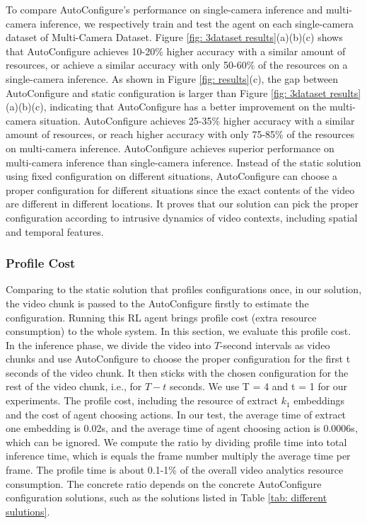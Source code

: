 To compare AutoConfigure's performance on single-camera inference and multi-camera inference, we respectively train and test the agent on each single-camera dataset of Multi-Camera Dataset. Figure \ref{fig: 3dataset results}(a)(b)(c) shows that AutoConfigure achieves 10-20\% higher accuracy with a similar amount of resources, or achieve a similar accuracy with only 50-60\% of the resources on a single-camera inference.  As shown in Figure \ref{fig: results}(c), the gap between AutoConfigure and static configuration is larger than Figure \ref{fig: 3dataset results}(a)(b)(c), indicating that AutoConfigure has a better improvement on the multi-camera situation. AutoConfigure achieves 25-35\% higher accuracy with a similar amount of resources, or reach higher accuracy with only 75-85\% of the resources on multi-camera inference. AutoConfigure achieves superior performance on multi-camera inference than single-camera inference. Instead of the static solution using fixed configuration on different situations, AutoConfigure can choose a proper configuration for different situations since the exact contents of the video are different in different locations. It proves that our solution can pick the proper configuration according to intrusive dynamics of video contexts, including spatial and temporal features.  


\subsubsection{Profile Cost}
\label{subsec: profile cost}
Comparing to the static solution that profiles configurations once, in our solution, the video
chunk is passed to the AutoConfigure firstly to estimate the configuration. Running this RL agent brings profile cost (extra resource consumption) to the whole system. In this section, we evaluate this profile cost. In the inference phase, we divide the video into $T$-second intervals as video chunks and use AutoConfigure to choose the proper configuration for the first t seconds of the video chunk. It then sticks with the chosen configuration for the rest of the video chunk, i.e., for $T-t$ seconds. We use T = 4 and t = 1 for our experiments. The profile cost, including the resource of extract $k_1$ embeddings and the cost of agent choosing actions. In our test, the average time of extract one embedding is 0.02s, and the average time of agent choosing action is 0.0006s, which can be ignored. We compute the ratio by dividing profile time into total inference time, which is equals the frame number multiply the average time per frame. The profile time is about 0.1-1\% of the overall video analytics resource consumption. The concrete ratio depends on the concrete AutoConfigure configuration solutions, such as the solutions listed in Table \ref{tab: different sulutions}.        


